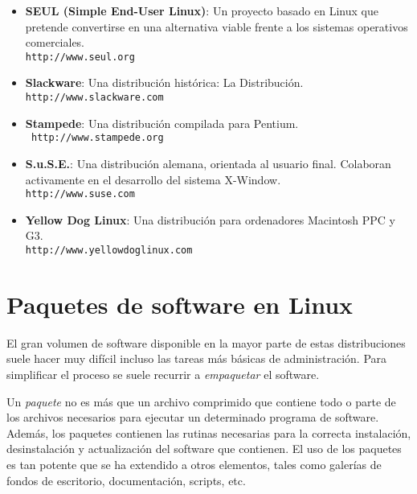 \begin{itemize}
\item {\bf SEUL (Simple End-User  Linux)}: Un proyecto basado en Linux
que  pretende  convertirse en  una  alternativa  viable frente  a  los
sistemas operativos comerciales. \\ {\tt http://www.seul.org}

\item {\bf Slackware}: Una distribución histórica: La Distribución. \\
{\tt http://www.slackware.com}

\item {\bf Stampede}: Una distribución compilada para Pentium. \\ {\tt
http://www.stampede.org}

\item  {\bf   S.u.S.E.}:  Una  distribución
alemana,  orientada  al usuario  final.  Colaboran  activamente en  el
desarrollo del sistema {\sf X-Window}. \\ {\tt http://www.suse.com}


\item  {\bf  Yellow  Dog  Linux}: Una  distribución  para  ordenadores
Macintosh PPC y G3. \\ {\tt http://www.yellowdoglinux.com}

\end{itemize}

\section{Paquetes de software en Linux}

El gran  volumen de  software disponible  en la  mayor parte  de estas
distribuciones suele hacer muy difícil  incluso las tareas más básicas
de administración.  Para simplificar  el proceso  se suele  recurrir a
{\em empaquetar} el software.

Un {\em paquete}  no es más que  un archivo comprimido
que contiene todo o parte de  los archivos necesarios para ejecutar un
determinado programa  de software. Además, los  paquetes contienen las
rutinas  necesarias para  la  correcta  instalación, desinstalación  y
actualización del  software que contienen.  El uso de los  paquetes es
tan potente que se ha extendido a otros elementos, tales como galerías
de fondos de escritorio, documentación, scripts, etc.

